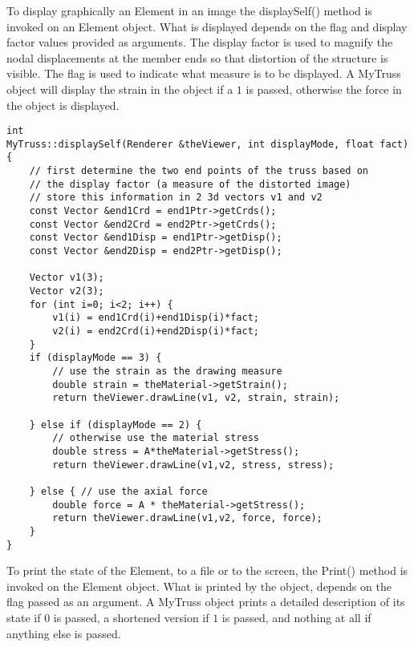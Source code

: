 \documentclass[12pt]{article}
\begin{document}
To display graphically an Element in an image the {\sf displaySelf()}
method is invoked on an Element object. What is displayed depends on
the flag and display factor values provided as arguments. The display
factor is used to magnify the nodal displacements at the member ends
so that distortion of the structure is visible. The flag is used to
indicate what measure is to be displayed. A MyTruss object will
display the strain in the object if a $1$ is passed, otherwise the
force in the object is displayed.

{\sf\small
\begin{verbatim}
int
MyTruss::displaySelf(Renderer &theViewer, int displayMode, float fact)
{
    // first determine the two end points of the truss based on
    // the display factor (a measure of the distorted image)
    // store this information in 2 3d vectors v1 and v2
    const Vector &end1Crd = end1Ptr->getCrds();
    const Vector &end2Crd = end2Ptr->getCrds();	
    const Vector &end1Disp = end1Ptr->getDisp();
    const Vector &end2Disp = end2Ptr->getDisp();    

    Vector v1(3);
    Vector v2(3);
    for (int i=0; i<2; i++) {
        v1(i) = end1Crd(i)+end1Disp(i)*fact;
        v2(i) = end2Crd(i)+end2Disp(i)*fact;    
    }
    if (displayMode == 3) {  
        // use the strain as the drawing measure
        double strain = theMaterial->getStrain();
        return theViewer.drawLine(v1, v2, strain, strain);	

    } else if (displayMode == 2) { 
        // otherwise use the material stress
        double stress = A*theMaterial->getStress();
        return theViewer.drawLine(v1,v2, stress, stress);

    } else { // use the axial force
        double force = A * theMaterial->getStress();
        return theViewer.drawLine(v1,v2, force, force);
    }
}
\end{verbatim} }

To print the state of the Element, to a file or to the screen, the
{\sf Print()} method is invoked on the Element object. What is
printed by the object, depends on the flag passed as an argument. A
MyTruss object prints a detailed description of its state if $0$ is
passed, a shortened version if $1$ is passed, and nothing at all if
anything else is passed.
\end{document}
